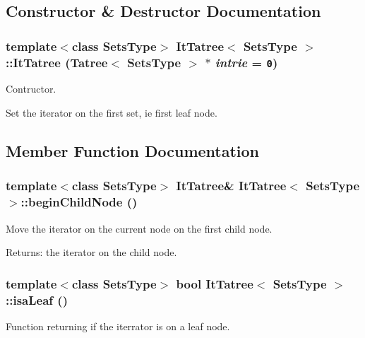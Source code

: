 \subsection{Constructor \& Destructor Documentation}
\subsubsection{\setlength{\rightskip}{0pt plus 5cm}template$<$class Sets\-Type$>$ {\bf It\-Tatree}$<$ Sets\-Type $>$::{\bf It\-Tatree} ({\bf Tatree}$<$ Sets\-Type $>$ $\ast$ {\em intrie} = {\tt 0})}\label{class_it_tatree_acfb30ef2cea812597633a02d7bdc8d5}


Contructor. 

Set the iterator on the first set, ie first leaf node. 

\subsection{Member Function Documentation}
\subsubsection{\setlength{\rightskip}{0pt plus 5cm}template$<$class Sets\-Type$>$ {\bf It\-Tatree}\& {\bf It\-Tatree}$<$ Sets\-Type $>$::begin\-Child\-Node ()\hspace{0.3cm}{\tt  [inline]}}\label{class_it_tatree_9ad0f33f663a41e5920a816f42882ed5}


Move the iterator on the current node on the first child node. 

\begin{Desc}
\item[Returns:]the iterator on the child node. \end{Desc}
\subsubsection{\setlength{\rightskip}{0pt plus 5cm}template$<$class Sets\-Type$>$ bool {\bf It\-Tatree}$<$ Sets\-Type $>$::isa\-Leaf ()\hspace{0.3cm}{\tt  [inline]}}\label{class_it_tatree_2763688a7b8764f16aa326d5235ec002}


Function returning if the iterrator is on a leaf node. 


